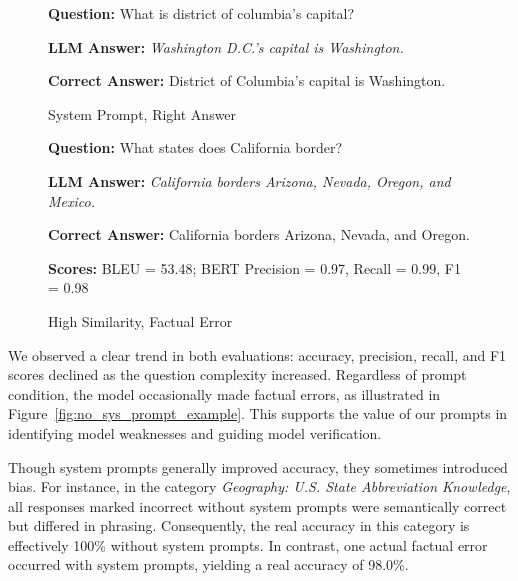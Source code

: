 \documentclass{article}
\begin{document}
\begin{figure}[H]
\centering
\caption{System Prompt, Right Answer}
\label{fig:example_sys_prompt_help}
\begin{tcolorbox}[colback=gray!5!white, colframe=gray!50!black, title=With System Prompt, fonttitle=\bfseries, breakable, width=\textwidth]
\textbf{Question:} What is district of columbia's capital?

\medskip
\textbf{LLM Answer:} \emph{Washington D.C.'s capital is Washington.}

\medskip
\textbf{Correct Answer:} District of Columbia's capital is Washington.
\end{tcolorbox}
\end{figure}

\newpage
\begin{figure}[H]
\centering
\caption{High Similarity, Factual Error}
\label{fig:example_high_similarity_error}
\begin{tcolorbox}[colback=gray!5!white, colframe=gray!50!black, title=BERT Similarity Example, fonttitle=\bfseries, breakable, width=\textwidth]
\textbf{Question:} What states does California border?

\medskip
\textbf{LLM Answer:} \emph{California borders Arizona, Nevada, Oregon, and Mexico.}

\medskip
\textbf{Correct Answer:} California borders Arizona, Nevada, and Oregon.

\medskip
\textbf{Scores:} BLEU = 53.48; BERT Precision = 0.97, Recall = 0.99, F1 = 0.98
\end{tcolorbox}
\end{figure}


We observed a clear trend in both evaluations: accuracy, precision, recall, and F1 scores declined as the question 
complexity increased. Regardless of prompt condition, the model occasionally made factual errors, as illustrated in 
Figure~\ref{fig:no_sys_prompt_example}. This supports the value of our prompts in identifying model weaknesses and 
guiding model verification.

Though system prompts generally improved accuracy, they sometimes introduced bias. For instance, 
in the category \emph{Geography: U.S. State Abbreviation Knowledge}, all responses marked incorrect 
without system prompts were semantically correct but differed in phrasing. Consequently, the real accuracy 
in this category is effectively 100\% without system prompts. In contrast, one actual factual error occurred 
with system prompts, yielding a real accuracy of 98.0\%.
\end{document}
